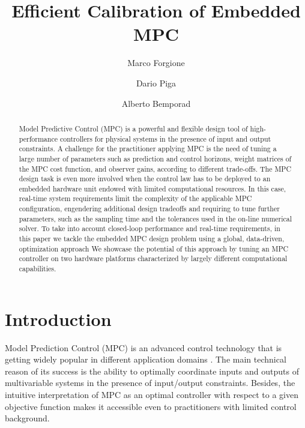 \documentclass{article}
\title{Efficient Calibration of Embedded MPC}
\author[1]{Marco Forgione}
\author[1]{Dario Piga}
\author[2]{Alberto Bemporad}
\affil[1]{IDSIA Dalle Molle Institute for Artificial Intelligence SUPSI-USI, Manno, Switzerland}
\affil[2]{IMT School for Advanced Studies Lucca,  Lucca, Italy}
\begin{document}
\maketitle


\begin{abstract}                %
Model Predictive Control (MPC) is a powerful and flexible design tool of  high-performance controllers for physical systems in 
the presence of input and output constraints. 
A challenge for the practitioner applying MPC is the need of tuning a large number of parameters   such as prediction and control horizons, weight matrices of the MPC cost function, and observer gains, according to different trade-offs. The MPC design task is even more involved when the control law has to be deployed to an embedded hardware unit endowed with limited computational resources. In this case, real-time system requirements limit the complexity of the applicable MPC configuration, engendering additional design tradeoffs and requiring to tune further parameters, such as the sampling time and the tolerances used in the on-line numerical solver. 
To take into account closed-loop performance and real-time requirements, in this paper we tackle the embedded MPC design problem using a global, data-driven, optimization approach
We showcase the potential of this approach by tuning an MPC controller  on two hardware platforms characterized by largely different computational capabilities.
\end{abstract}


\section{Introduction}
Model Prediction Control (MPC) is an advanced control technology that is getting widely popular in different application
domains \citep{borrelli2017predictive}.
The main technical reason of its success is the ability to optimally coordinate inputs and outputs of  multivariable systems in the presence of input/output constraints. 
Besides, the intuitive interpretation of MPC as an optimal controller with respect to a given objective function makes it accessible even to practitioners with limited control  background. 
\end{document}
